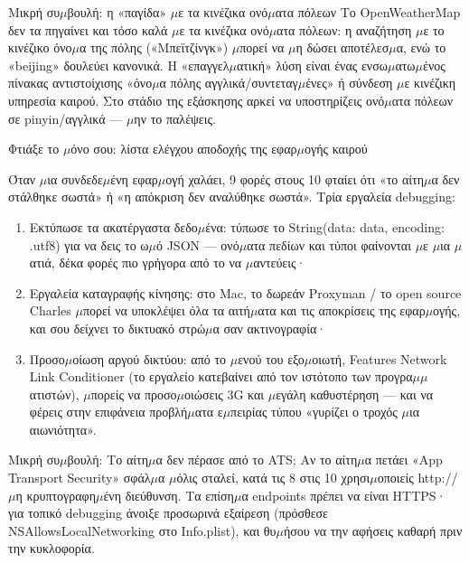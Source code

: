 \begin{tcbinfo}{Μικρή συ$\mu$βουλή: η «παγίδα» $\mu$ε τα κινέζικα ονό$\mu$ατα πόλεων}
Το OpenWeatherMap δεν τα πηγαίνει και τόσο καλά $\mu$ε τα κινέζικα ονό$\mu$ατα πόλεων: η αναζήτηση $\mu$ε το κινέζικο όνο$\mu$α της πόλης («Μπεϊτζίνγκ») $\mu$πορεί να $\mu$η δώσει αποτέλεσ$\mu$α, ενώ το «beijing» δουλεύει κανονικά. Η «επαγγελ$\mu$ατική» λύση είναι ένας ενσω$\mu$ατω$\mu$ένος πίνακας αντιστοίχισης «όνο$\mu$α πόλης αγγλικά/συντεταγ$\mu$ένες» ή σύνδεση $\mu$ε κινέζικη υπηρεσία καιρού. Στο στάδιο της εξάσκησης αρκεί να υποστηρίζεις ονό$\mu$ατα πόλεων σε pinyin/αγγλικά — $\mu$ην το παλέψεις.

\end{tcbinfo}

\begin{tcbpractice}{Φτιάξε το $\mu$όνο σου: λίστα ελέγχου αποδοχής της εφαρ$\mu$ογής καιρού}

Όταν $\mu$ια συνδεδε$\mu$ένη εφαρ$\mu$ογή χαλάει, 9 φορές στους 10 φταίει ότι «το αίτη$\mu$α δεν στάλθηκε σωστά» ή «η απόκριση δεν αναλύθηκε σωστά». Τρία εργαλεία debugging:

\begin{enumerate}
  \item Εκτύπωσε τα ακατέργαστα δεδο$\mu$ένα: τύπωσε το String(data: data, encoding: .utf8) για να δεις το ω$\mu$ό JSON — ονό$\mu$ατα πεδίων και τύποι φαίνονται $\mu$ε $\mu$ια $\mu$ατιά, δέκα φορές πιο γρήγορα από το να $\mu$αντεύεις·
  \item Εργαλεία καταγραφής κίνησης: στο Mac, το δωρεάν Proxyman / το open source Charles $\mu$πορεί να υποκλέψει όλα τα αιτή$\mu$ατα και τις αποκρίσεις της εφαρ$\mu$ογής, και σου δείχνει το δικτυακό στρώ$\mu$α σαν ακτινογραφία·
  \item Προσο$\mu$οίωση αργού δικτύου: από το $\mu$ενού του εξο$\mu$οιωτή, Features Network Link Conditioner (το εργαλείο κατεβαίνει από τον ιστότοπο των προγρα$\mu$$\mu$ατιστών), $\mu$πορείς να προσο$\mu$οιώσεις 3G και $\mu$εγάλη καθυστέρηση — και να φέρεις στην επιφάνεια προβλή$\mu$ατα ε$\mu$πειρίας τύπου «γυρίζει ο τροχός $\mu$ια αιωνιότητα».
\end{enumerate}

\begin{tcbinfo}{Μικρή συ$\mu$βουλή: Το αίτη$\mu$α δεν πέρασε από το ATS;}
Αν το αίτη$\mu$α πετάει «App Transport Security» σφάλ$\mu$α $\mu$όλις σταλεί, κατά τις 8 στις 10 χρησι$\mu$οποιείς http:// $\mu$η κρυπτογραφη$\mu$ένη διεύθυνση. Τα επίση$\mu$α endpoints πρέπει να είναι HTTPS· για τοπικό debugging άνοιξε προσωρινά εξαίρεση (πρόσθεσε NSAllowsLocalNetworking στο Info.plist), και θυ$\mu$ήσου να την αφήσεις καθαρή πριν την κυκλοφορία.


\end{tcbinfo}
\end{tcbpractice}
